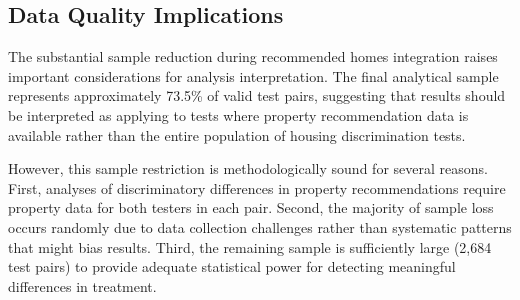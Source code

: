 \documentclass{article}
\begin{document}
\subsection{Data Quality Implications}

The substantial sample reduction during recommended homes integration raises important considerations for analysis interpretation. The final analytical sample represents approximately 73.5\% of valid test pairs, suggesting that results should be interpreted as applying to tests where property recommendation data is available rather than the entire population of housing discrimination tests.

However, this sample restriction is methodologically sound for several reasons. First, analyses of discriminatory differences in property recommendations require property data for both testers in each pair. Second, the majority of sample loss occurs randomly due to data collection challenges rather than systematic patterns that might bias results. Third, the remaining sample is sufficiently large (2,684 test pairs) to provide adequate statistical power for detecting meaningful differences in treatment.
\end{document}
